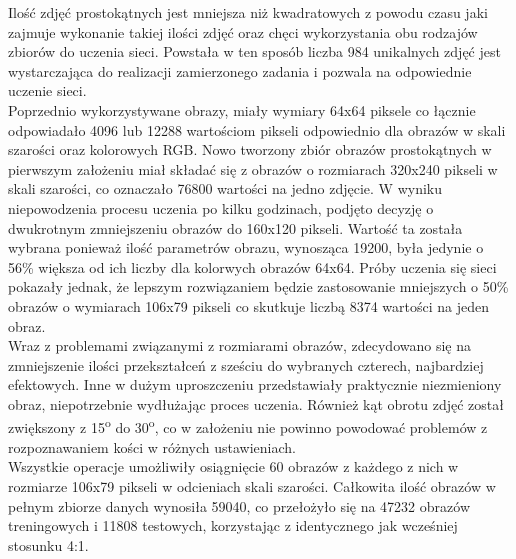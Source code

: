 Ilość zdjęć prostokątnych jest mniejsza niż kwadratowych z powodu czasu jaki zajmuje
wykonanie takiej ilości zdjęć oraz chęci wykorzystania obu rodzajów zbiorów do uczenia sieci.
Powstała w ten sposób liczba 984 unikalnych zdjęć jest wystarczająca do realizacji
zamierzonego zadania i pozwala na odpowiednie uczenie sieci. \\
Poprzednio wykorzystywane obrazy, miały wymiary 64x64 piksele co łącznie odpowiadało
4096 lub 12288 wartościom pikseli odpowiednio dla obrazów w skali szarości oraz
kolorowych RGB. Nowo tworzony zbiór obrazów prostokątnych w pierwszym założeniu miał
składać się z obrazów o rozmiarach 320x240 pikseli w skali szarości, co oznaczało
76800 wartości na jedno zdjęcie. W wyniku niepowodzenia procesu uczenia po kilku godzinach,
podjęto decyzję o dwukrotnym zmniejszeniu obrazów do 160x120 pikseli. Wartość ta
została wybrana ponieważ ilość parametrów obrazu, wynosząca 19200, była jedynie o 56\%
większa od ich liczby dla kolorwych obrazów 64x64. Próby uczenia się sieci pokazały jednak,
że lepszym rozwiązaniem będzie zastosowanie mniejszych o 50\% obrazów o wymiarach
106x79 pikseli co skutkuje liczbą 8374 wartości na jeden obraz. \\
Wraz z problemami związanymi z rozmiarami obrazów, zdecydowano się na zmniejszenie ilości
przekształceń z sześciu do wybranych czterech, najbardziej efektowych. Inne w dużym
uproszczeniu przedstawiały praktycznie niezmieniony obraz, niepotrzebnie wydłużając proces
uczenia. Również kąt obrotu zdjęć został zwiększony z 15\textsuperscript{o}
do 30\textsuperscript{o}, co w założeniu nie powinno powodować problemów z rozpoznawaniem
kości w różnych ustawieniach. \\
Wszystkie operacje umożliwiły osiągnięcie 60 obrazów z każdego z nich w rozmiarze
106x79 pikseli w odcieniach skali szarości. Całkowita ilość obrazów w pełnym zbiorze
danych wynosiła 59040, co przełożyło się na 47232 obrazów treningowych i 11808 testowych,
korzystając z identycznego jak wcześniej stosunku 4:1.
